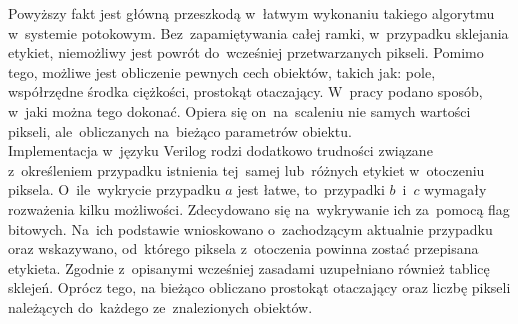 Powyższy fakt jest główną przeszkodą w~łatwym wykonaniu takiego algorytmu w~systemie potokowym. 
Bez~zapamiętywania całej ramki, w~przypadku sklejania etykiet, niemożliwy jest powrót do~wcześniej przetwarzanych pikseli. 
Pomimo tego, możliwe jest obliczenie pewnych cech obiektów, takich jak: pole, współrzędne środka ciężkości, prostokąt otaczający. 
W~pracy \cite{COG} podano sposób, w~jaki można tego dokonać. 
Opiera się on~na~scaleniu nie samych wartości pikseli, ale~obliczanych na~bieżąco parametrów obiektu.\\ 
Implementacja w~języku Verilog rodzi dodatkowo trudności związane z~określeniem przypadku istnienia tej~samej lub~różnych etykiet w~otoczeniu piksela. 
O~ile~wykrycie przypadku $a$ jest łatwe, to~przypadki $b$~i~$c$ wymagały rozważenia kilku możliwości. 
Zdecydowano się na~wykrywanie ich za~pomocą flag bitowych. 
Na~ich podstawie wnioskowano o~zachodzącym aktualnie przypadku oraz wskazywano, od~którego piksela z~otoczenia powinna zostać przepisana etykieta. Zgodnie z~opisanymi wcześniej zasadami uzupełniano również tablicę sklejeń.
Oprócz tego, na bieżąco obliczano prostokąt otaczający oraz liczbę pikseli należących do~każdego ze~znalezionych obiektów. \\

